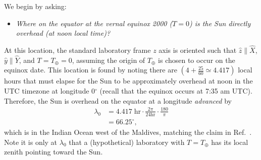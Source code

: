 We begin by asking:
%
\begin{itemize}
\centering
\item[] \emph{Where on the equator at the vernal equinox 2000 ($T=0$)
is the Sun directly overhead (at noon local time)?}
\end{itemize}
%
At this location, the standard laboratory frame $z$ axis
is oriented such that 
$\widehat{z} \parallel \widehat{X}$, $\widehat{y} \parallel \widehat{Y}$, 
and $T = T_\oplus = 0$, assuming the origin of 
$T_\oplus$ is chosen to occur on the equinox date. This location
is found by noting there are 
$(4 + \frac{25}{60} \simeq 4.417)$ local hours that 
must elapse for the Sun to be approximately overhead at noon in the UTC 
timezone at longitude 0$^{\circ}$ (recall that the equinox
occurs at 7:35 am UTC). Therefore, the Sun
is overhead on the equator at a longitude \emph{advanced} by 
\begin{align}
\label{angularshift}
\lambda_0 &= 4.417\;\text{hr}\cdot\frac{2\pi}{24 \text{hr}}
\cdot\frac{180}{\pi} \nonumber\\
&= 66.25^{\circ},
\end{align}
which is in the Indian Ocean west of the Maldives, matching the claim 
in Ref.~\cite{kd16}. 
Note it is only at $\lambda_0$
that a (hypothetical) laboratory with $T = T_\oplus$ has its local zenith
pointing toward the Sun.

